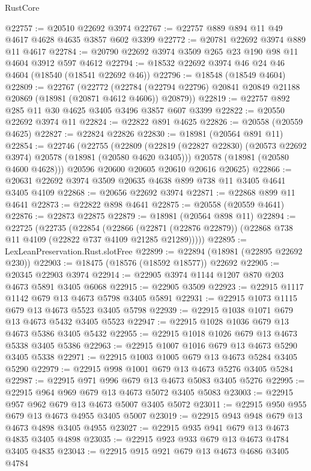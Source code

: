 \begin{lexlean}{RustCore}
\begin{coremodule}
@22757 := @20510 @22692 @3974
@22767 := @22757 @889 @894 @11 @49 @4617 @4628 @4635 @3857 @602 @3399
@22772 := @20781 @22692 @3974 @889 @11 @4617
@22784 := @20790 @22692 @3974 @3509 @265 @23 @190 @98 @11 @4604 @3912 @597 @4612
@22794 := @18532 @22692 @3974 @46 @24 @46 @4604 (@18540 (@18541 @22692 @46))
@22796 := @18548 (@18549 @4604)
@22809 := @22767
    (@22772
      (@22784 (@22794 @22796) @20841 @20849 @21188 @20869 (@18981 (@20871 @4612 @4606)) @20879))
@22819 := @22757 @892 @285 @11 @30 @4625 @3405 @3496 @3857 @607 @3399
@22822 := @20550 @22692 @3974 @11
@22824 := @22822 @891 @4625
@22826 := @20558 (@20559 @4625)
@22827 := @22824 @22826
@22830 := @18981 (@20564 @891 @11)
@22854 := @22746
    (@22755
      (@22809
        (@22819 (@22827 @22830) (@20573 @22692 @3974) @20578 (@18981 (@20580 @4620 @3405)))
        @20578
        (@18981 (@20580 @4600 @4628)))
      @20596
      @20600
      @20605
      @20610
      @20616
      @20625)
@22866 := @20631 @22692 @3974 @3509 @20635 @4638 @899 @738 @11 @3405 @4641 @3405 @4109
@22868 := @20656 @22692 @3974
@22871 := @22868 @899 @11 @4641
@22873 := @22822 @898 @4641
@22875 := @20558 (@20559 @4641)
@22876 := @22873 @22875
@22879 := @18981 (@20564 @898 @11)
@22894 := @22725
    (@22735
      (@22854
        (@22866
          (@22871 (@22876 @22879))
          (@22868 @738 @11 @4109 (@22822 @737 @4109 @21285 @21289)))))
@22895 := LexLeanPreservation.Rust.slotFree
@22899 := @22894 (@18981 (@22895 @22692 @230))
@22903 := @18475 (@18576 (@18592 @18577)) @22692
@22905 := @20345 @22903 @3974
@22914 := @22905 @3974 @1144 @1207 @870 @203 @4673 @5891 @3405 @6068
@22915 := @22905 @3509
@22923 := @22915 @1117 @1142 @679 @13 @4673 @5798 @3405 @5891
@22931 := @22915 @1073 @1115 @679 @13 @4673 @5523 @3405 @5798
@22939 := @22915 @1038 @1071 @679 @13 @4673 @5432 @3405 @5523
@22947 := @22915 @1028 @1036 @679 @13 @4673 @5386 @3405 @5432
@22955 := @22915 @1018 @1026 @679 @13 @4673 @5338 @3405 @5386
@22963 := @22915 @1007 @1016 @679 @13 @4673 @5290 @3405 @5338
@22971 := @22915 @1003 @1005 @679 @13 @4673 @5284 @3405 @5290
@22979 := @22915 @998 @1001 @679 @13 @4673 @5276 @3405 @5284
@22987 := @22915 @971 @996 @679 @13 @4673 @5083 @3405 @5276
@22995 := @22915 @964 @969 @679 @13 @4673 @5072 @3405 @5083
@23003 := @22915 @957 @962 @679 @13 @4673 @5007 @3405 @5072
@23011 := @22915 @950 @955 @679 @13 @4673 @4955 @3405 @5007
@23019 := @22915 @943 @948 @679 @13 @4673 @4898 @3405 @4955
@23027 := @22915 @935 @941 @679 @13 @4673 @4835 @3405 @4898
@23035 := @22915 @923 @933 @679 @13 @4673 @4784 @3405 @4835
@23043 := @22915 @915 @921 @679 @13 @4673 @4686 @3405 @4784

\end{coremodule}
\end{lexlean}
